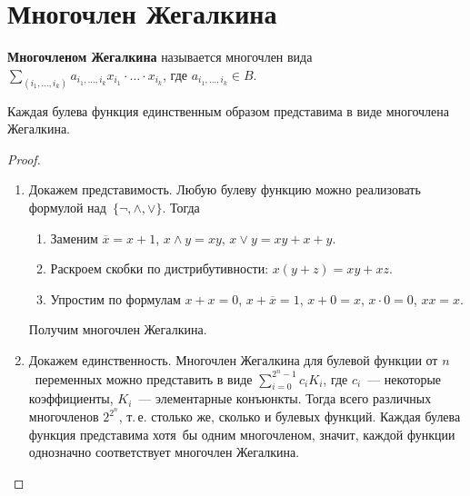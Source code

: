 \section{Многочлен Жегалкина}
 \textbf{Многочленом Жегалкина} называется многочлен вида
$\sum\limits_{(i_1, \ldots, i_k)} a_{i_1, \ldots, i_k} x_{i_1} \cdot \ldots \cdot x_{i_k}$, где $a_{i_1, \ldots, i_k} \in B$.

\begin{theorem}[Жегалкина]
Каждая булева функция единственным образом представима в виде многочлена Жегалкина.
\end{theorem}
\begin{proof}
\begin{enumerate}
	\item Докажем представимость.
	Любую булеву функцию можно реализовать формулой над~$\{ \neg, \land, \lor \}$.
	Тогда
	\begin{enumerate}
		\item Заменим $\overline x = x + 1$, $x \land y = xy$, $x \lor y = xy + x + y$.
		\item Раскроем скобки по дистрибутивности: $x(y + z) = xy + xz$.
		\item Упростим по формулам $x + x = 0$, $x + \overline x = 1$, $x + 0 = x$, $x \cdot 0 = 0$, $xx = x$.
	\end{enumerate}
	
	Получим многочлен Жегалкина.
	
	\item Докажем единственность.
	Многочлен Жегалкина для булевой функции от $n$~переменных можно представить в виде $\sum\limits_{i=0}^{2^n-1} c_i K_i$, где $c_i$~--- некоторые коэффициенты, $K_i$~--- элементарные конъюнкты.
	Тогда всего различных многочленов $2^{2^n}$, т.\,е. столько же, сколько и булевых функций.
	Каждая булева функция представима хотя~бы одним многочленом, значит, каждой функции однозначно соответствует многочлен Жегалкина.
\end{enumerate}
\end{proof}

